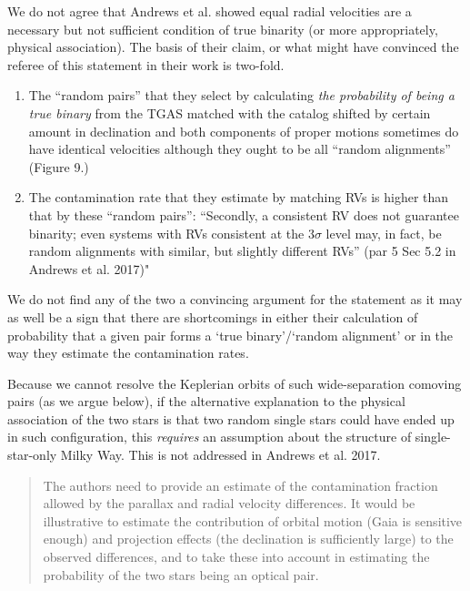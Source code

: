 \documentclass[12pt]{article}
\begin{document}
We do not agree that Andrews et al. showed equal radial velocities are a
necessary but not sufficient condition of true binarity (or more
appropriately, physical association). The basis of their claim, or what
might have convinced the referee of this statement in their work is
two-fold.

\begin{enumerate}
\def\labelenumi{\arabic{enumi}.}
\itemsep1pt\parskip0pt
\item
  The ``random pairs'' that they select by calculating \emph{the
  probability of being a true binary} from the TGAS matched with the
  catalog shifted by certain amount in declination and both components
  of proper motions sometimes do have identical velocities although they
  ought to be all ``random alignments'' (Figure 9.)
\item
  The contamination rate that they estimate by matching RVs is higher
  than that by these ``random pairs'': ``Secondly, a consistent RV does
  not guarantee binarity; even systems with RVs consistent at the
  $3\sigma$ level may, in fact, be random alignments with similar, but
  slightly different RVs'' (par 5 Sec 5.2 in Andrews et al. 2017)"
\end{enumerate}

We do not find any of the two a convincing argument for the statement
as it may as well be a sign that there are shortcomings in
either their calculation of probability that a given pair forms a `true
binary'/`random alignment' or in the way they estimate the contamination
rates.

Because we cannot resolve the Keplerian orbits of such wide-separation comoving
pairs (as we argue below), if the alternative explanation to the physical
association of the two stars is that two random single stars could have ended up
in such configuration, this {\it requires} an assumption about the structure of
single-star-only Milky Way. This is not addressed in Andrews et al. 2017.


\begin{quote}
The authors need to provide an estimate of the contamination fraction
allowed by the parallax and radial velocity differences. It would be
illustrative to estimate the contribution of orbital motion (Gaia is
sensitive enough) and projection effects (the declination is
sufficiently large) to the observed differences, and to take these into
account in estimating the probability of the two stars being an optical
pair.
\end{quote}
\end{document}
